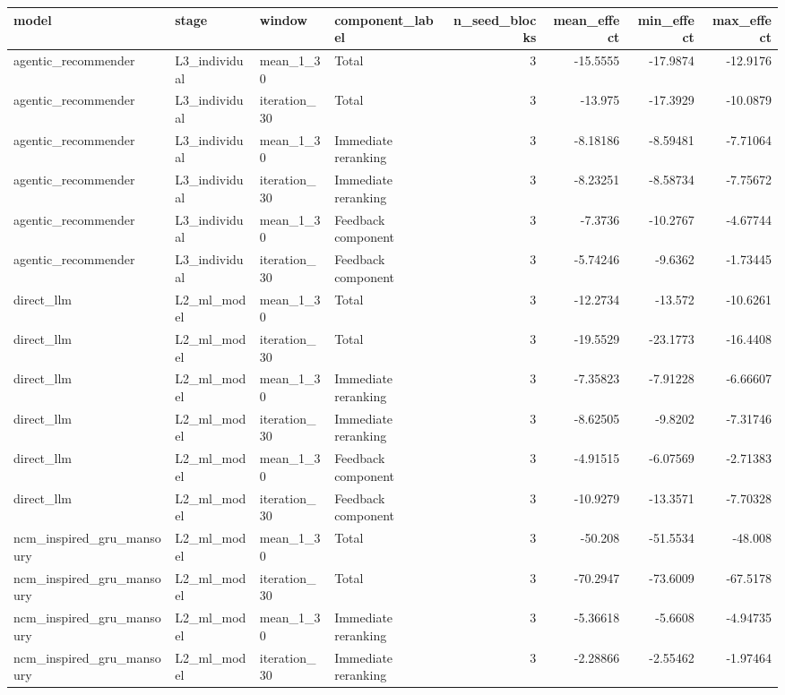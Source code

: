 \begin{table}[htbp!]
\centering
\small
\setlength{\tabcolsep}{3pt}
\renewcommand{\arraystretch}{1.1}
\begin{tabular}{llllrrrr}
\hline
model & stage & window & component\_label & n\_seed\_blocks & mean\_effect & min\_effect & max\_effect \\
\hline
agentic\_recommender & L3\_individual & mean\_1\_30 & Total & 3 & -15.5555 & -17.9874 & -12.9176 \\
agentic\_recommender & L3\_individual & iteration\_30 & Total & 3 & -13.975 & -17.3929 & -10.0879 \\
agentic\_recommender & L3\_individual & mean\_1\_30 & Immediate reranking & 3 & -8.18186 & -8.59481 & -7.71064 \\
agentic\_recommender & L3\_individual & iteration\_30 & Immediate reranking & 3 & -8.23251 & -8.58734 & -7.75672 \\
agentic\_recommender & L3\_individual & mean\_1\_30 & Feedback component & 3 & -7.3736 & -10.2767 & -4.67744 \\
agentic\_recommender & L3\_individual & iteration\_30 & Feedback component & 3 & -5.74246 & -9.6362 & -1.73445 \\
direct\_llm & L2\_ml\_model & mean\_1\_30 & Total & 3 & -12.2734 & -13.572 & -10.6261 \\
direct\_llm & L2\_ml\_model & iteration\_30 & Total & 3 & -19.5529 & -23.1773 & -16.4408 \\
direct\_llm & L2\_ml\_model & mean\_1\_30 & Immediate reranking & 3 & -7.35823 & -7.91228 & -6.66607 \\
direct\_llm & L2\_ml\_model & iteration\_30 & Immediate reranking & 3 & -8.62505 & -9.8202 & -7.31746 \\
direct\_llm & L2\_ml\_model & mean\_1\_30 & Feedback component & 3 & -4.91515 & -6.07569 & -2.71383 \\
direct\_llm & L2\_ml\_model & iteration\_30 & Feedback component & 3 & -10.9279 & -13.3571 & -7.70328 \\
ncm\_inspired\_gru\_mansoury & L2\_ml\_model & mean\_1\_30 & Total & 3 & -50.208 & -51.5534 & -48.008 \\
ncm\_inspired\_gru\_mansoury & L2\_ml\_model & iteration\_30 & Total & 3 & -70.2947 & -73.6009 & -67.5178 \\
ncm\_inspired\_gru\_mansoury & L2\_ml\_model & mean\_1\_30 & Immediate reranking & 3 & -5.36618 & -5.6608 & -4.94735 \\
ncm\_inspired\_gru\_mansoury & L2\_ml\_model & iteration\_30 & Immediate reranking & 3 & -2.28866 & -2.55462 & -1.97464 \\

\end{tabular}
\end{table}
